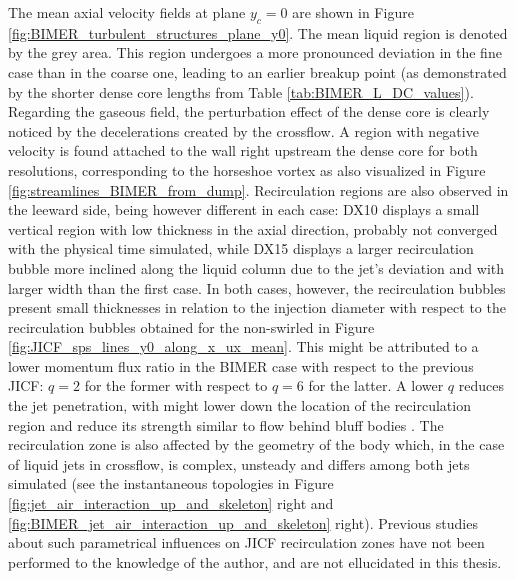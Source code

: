 The mean axial velocity fields at plane $y_c = 0$ are shown in Figure \ref{fig:BIMER_turbulent_structures_plane_y0}. The mean liquid region is denoted by the grey area. This region undergoes a more pronounced deviation in the fine case than in the coarse one, leading to an earlier breakup point (as demonstrated by the shorter dense core lengths from Table \ref{tab:BIMER_L_DC_values}). Regarding the gaseous field, the perturbation effect of the dense core is clearly noticed by the decelerations created by the crossflow. A region with negative velocity is found attached to the wall right upstream the dense core for both resolutions, corresponding to the horseshoe vortex as also visualized in Figure \ref{fig:streamlines_BIMER_from_dump}. Recirculation regions are also observed in the leeward side, being however different in each case: DX10 displays a small vertical region with low thickness in the axial direction, probably not converged with the physical time simulated, while DX15 displays a larger recirculation bubble more inclined along the liquid column due to the jet's deviation  and with larger width than the first case. In both cases, however, the recirculation bubbles present small thicknesses in relation to the injection diameter with respect to the recirculation bubbles obtained  for the non-swirled in Figure \ref{fig:JICF_sps_lines_y0_along_x_ux_mean}. This might be attributed to a lower momentum flux ratio in the BIMER case with respect to the previous JICF: $q = 2$ for the former with respect to $q = 6$ for the latter. A lower $q$ reduces the jet penetration, with might lower down the location of the recirculation region and reduce its strength similar to flow behind bluff bodies . The recirculation zone is also affected by the geometry of the body which, in the case of liquid jets in crossflow, is complex, unsteady and differs among both jets simulated (see the instantaneous topologies in Figure \ref{fig:jet_air_interaction_up_and_skeleton} right and \ref{fig:BIMER_jet_air_interaction_up_and_skeleton} right). Previous studies about such parametrical influences on JICF recirculation zones have not been performed to the knowledge of the author, and are not ellucidated in this thesis. 


